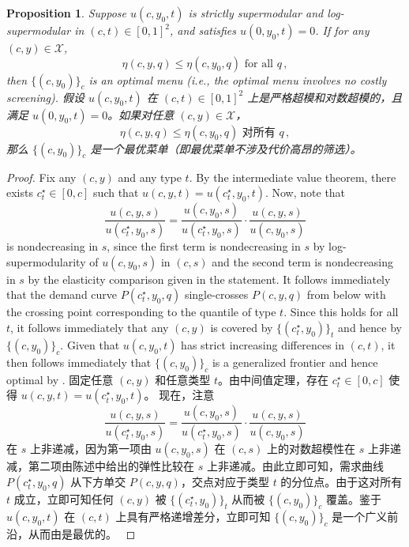 \documentclass[12pt,letterpaper]{article}
\newenvironment{original}{\color{black}\noindent}{}
\newenvironment{translation}{\color{blue}\noindent}{}
\theoremstyle{plain}
\newtheorem{prop}{Proposition}
\theoremstyle{definition}
\theoremstyle{remark}
\renewcommand{\1}{\mathds{1}}
\newcommand{\X}{\mathcal{X}}
\theoremstyle{definition}
\begin{document}
\begin{prop}\label{prop:costly}
\begin{original}
Suppose $u(c, y_0, t)$ is strictly supermodular and log-supermodular in $(c, t) \in [0, 1]^2$, and satisfies $u(0, y_0, t) = 0$. If for any $(c, y) \in \X$,
\[\eta(c, y, q) \leq \eta(c, y_0, q) \text{ for all $q$}\,,\]
then $\big\{(c, y_0)\big\}_{c}$ is an optimal menu (i.e., the optimal menu involves no costly screening).
\end{original}
\begin{translation}
假设 $u(c, y_0, t)$ 在 $(c, t) \in [0, 1]^2$ 上是严格超模和对数超模的，且满足 $u(0, y_0, t) = 0$。如果对任意 $(c, y) \in \X$，
\[\eta(c, y, q) \leq \eta(c, y_0, q) \text{ 对所有 $q$}\,,\]
那么 $\big\{(c, y_0)\big\}_{c}$ 是一个最优菜单（即最优菜单不涉及代价高昂的筛选）。
\end{translation}
\end{prop}
\begin{proof}
\begin{original}
Fix any $(c, y)$ and any type $t$. By the intermediate value theorem, there exists $c^\star_t \in [0, c]$ such that $u(c, y, t) = u(c^\star_t, y_0, t)$.
Now, note that
\[\frac{u(c, y, s)}{u(c^\star_t, y_0, s)} = \frac{u(c, y_0, s)}{u(c^\star_t, y_0, s)} \cdot \frac{u(c, y, s)}{u(c, y_0, s)}\]
is nondecreasing in $s$, since the first term is nondecreasing in $s$ by log-supermodularity of $u(c, y_0, s)$ in $(c, s)$ and the second term is nondecreasing in $s$ by the elasticity comparison given in the statement. It follows immediately that the demand curve $P(c^\star_t, y_0, q)$ single-crosses $P(c, y, q)$ from below with the crossing point corresponding to the quantile of type $t$. Since this holds for all $t$, it follows immediately that any $(c, y)$ is covered by $\{(c^\star_t, y_0)\}_{t}$ and hence by $\{(c, y_0)\}_{c}$. Given that $u(c, y_0, t)$ has strict increasing differences in $(c, t)$, it then follows immediately that $\{(c, y_0)\}_{c}$ is a generalized frontier and hence optimal by .
\end{original}
\begin{translation}
固定任意 $(c, y)$ 和任意类型 $t$。由中间值定理，存在 $c^\star_t \in [0, c]$ 使得 $u(c, y, t) = u(c^\star_t, y_0, t)$。
现在，注意
\[\frac{u(c, y, s)}{u(c^\star_t, y_0, s)} = \frac{u(c, y_0, s)}{u(c^\star_t, y_0, s)} \cdot \frac{u(c, y, s)}{u(c, y_0, s)}\]
在 $s$ 上非递减，因为第一项由 $u(c, y_0, s)$ 在 $(c, s)$ 上的对数超模性在 $s$ 上非递减，第二项由陈述中给出的弹性比较在 $s$ 上非递减。由此立即可知，需求曲线 $P(c^\star_t, y_0, q)$ 从下方单交 $P(c, y, q)$，交点对应于类型 $t$ 的分位点。由于这对所有 $t$ 成立，立即可知任何 $(c, y)$ 被 $\{(c^\star_t, y_0)\}_{t}$ 从而被 $\{(c, y_0)\}_{c}$ 覆盖。鉴于 $u(c, y_0, t)$ 在 $(c, t)$ 上具有严格递增差分，立即可知 $\{(c, y_0)\}_{c}$ 是一个广义前沿，从而由是最优的。
\end{translation}
\end{proof}
\end{document}
